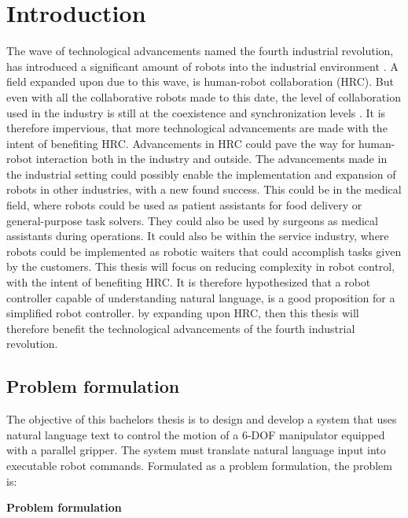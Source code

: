 \chapter{Introduction} \label{ch:intro}
The wave of technological advancements named the fourth industrial revolution, has introduced a significant amount of robots into the industrial environment \cite{4_0_Industrial_revolution}. A field expanded upon due to this wave, is human-robot collaboration (HRC). But even with all the collaborative robots made to this date, the level of collaboration used in the industry is still at the coexistence and synchronization levels \cite{HRC_levels}. It is therefore impervious, that more technological advancements are made with the intent of benefiting HRC. Advancements in HRC could pave the way for human-robot interaction both in the industry and outside. The advancements made in the industrial setting could possibly enable the implementation and expansion of robots in other industries, with a new found success. This could be in the medical field, where robots could be used as patient assistants for food delivery or general-purpose task solvers. They could also be used by surgeons as medical assistants during operations.
It could also be within the service industry, where robots could be implemented as robotic waiters that could accomplish tasks given by the customers.
This thesis will focus on reducing complexity in robot control, with the intent of benefiting HRC.
It is therefore hypothesized that a robot controller capable of understanding natural language, is a good proposition for a simplified robot controller. by expanding upon HRC, then this thesis will therefore benefit the technological advancements of the fourth industrial revolution.


\section{Problem formulation}
The objective of this bachelors thesis is to design and develop a system that uses natural language text to control the motion of a 6-DOF manipulator equipped with a parallel gripper. The system must translate natural language input into executable robot commands.
Formulated as a problem formulation, the problem is:

\begin{center}
    \textbf{Problem formulation}
\end{center}
\noindent{}
\begin{center}
\end{center}


